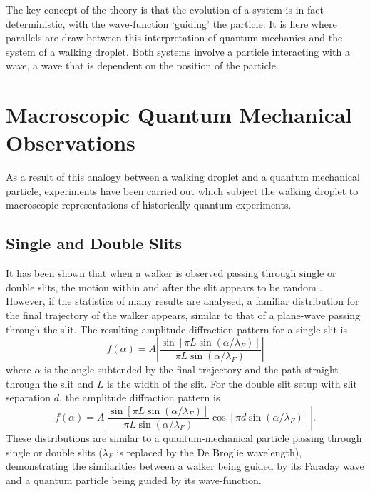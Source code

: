 \documentclass[11pt]{article}
\begin{document}
The key concept of the theory is that the evolution of a system is in fact deterministic, with the wave-function `guiding' the particle.  It is here where parallels are draw between this interpretation of quantum mechanics and the system of a walking droplet.  Both systems involve a particle interacting with a wave, a wave that is dependent on the position of the particle.

\section{Macroscopic Quantum Mechanical Observations}
\label{sec:macroscopicquantummechanicalobservations}
As a result of this analogy between a walking droplet and a quantum mechanical particle, experiments have been carried out which subject the walking droplet to macroscopic representations of historically quantum experiments.

\subsection{Single and Double Slits}
\label{sec:singleandcoubleslits}
It has been shown that when a walker is observed passing through single or double slits, the motion within and after the slit appears to be random \cite{1}.  However, if the statistics of many results are analysed, a familiar distribution for the final trajectory of the walker appears, similar to that of a plane-wave passing through the slit.  The resulting amplitude diffraction pattern for a single slit is
\begin{equation}
    \label{singleslitamplitude}
    f(\alpha)=A\left|\frac{\sin[\pi L\sin(\alpha/\lambda_F)]}{\pi L\sin(\alpha/\lambda_F)}\right|
\end{equation}
where $\alpha$ is the angle subtended by the final trajectory and the path straight through the slit and $L$ is the width of the slit.  For the double slit setup with slit separation $d$, the amplitude diffraction pattern is
\begin{equation}
    \label{doubleslitamplitude}
    f(\alpha)=A\left|\frac{\sin\left[\pi L\sin(\alpha/\lambda_F)\right]}{\pi L\sin(\alpha/\lambda_F)}\cos\left[\pi d\sin(\alpha/\lambda_F)\right]\right|.
\end{equation}
These distributions are similar to a quantum-mechanical particle passing through single or double slits ($\lambda_F$ is replaced by the De Broglie wavelength), demonstrating the similarities between a walker being guided by its Faraday wave and a quantum particle being guided by its wave-function.
\end{document}
